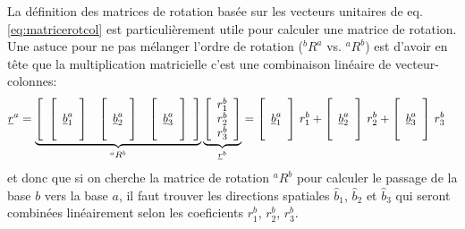 La définition des matrices de rotation basée sur les vecteurs unitaires de eq.\eqref{eq:matricerotcol} est particulièrement utile pour calculer une matrice de rotation. Une astuce pour ne pas mélanger l'ordre de rotation ($^bR^a$ vs. $^aR^b$) est d'avoir en tête que la multiplication matricielle c'est une combinaison linéaire de vecteur-colonnes:
\begin{align}
\underline{r}^a &= 
\underbrace{ \left[ \begin{array}{c c c} 
	\left[ \begin{array}{c} \\ \underline{b}_1^a \\  \\ \end{array}  \right] & \left[ \begin{array}{c} \\ \underline{b}_2^a \\  \\ \end{array}  \right] & \left[ \begin{array}{c} \\ \underline{b}_3^a \\  \\ \end{array}  \right]
\end{array} \right] }_{^aR^b}
\underbrace{ \left[ \begin{array}{c} r_1^b \\ r_2^b \\ r_3^b  \end{array} \right] }_{\underline{r}^b}
= 
\left[ \begin{array}{c} \\ \underline{b}_1^a \\  \\ \end{array}  \right] \, r_1^b + \left[ \begin{array}{c} \\ \underline{b}_2^a \\  \\ \end{array}  \right]\, r_2^b + \left[ \begin{array}{c} \\ \underline{b}_3^a \\  \\ \end{array}  \right] \, r_3^b 
\end{align}
et donc que si on cherche la matrice de rotation ${}^aR^b$ pour calculer le passage de la base $b$ vers la base $a$, il faut trouver les directions spatiales $\hat{b}_1$, $\hat{b}_2$ et $\hat{b}_3$ qui seront combinées linéairement selon les coeficients $r_1^b$, $r_2^b$, $r_3^b$. 

